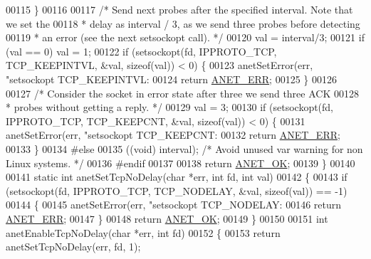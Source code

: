 \begin{DoxyCode}
{{{{00115     \}
00116 
00117     \textcolor{comment}{/* Send next probes after the specified interval. Note that we set the}
00118 \textcolor{comment}{     * delay as interval / 3, as we send three probes before detecting}
00119 \textcolor{comment}{     * an error (see the next setsockopt call). */}
00120     val = interval/3;
00121     \textcolor{keywordflow}{if} (val == 0) val = 1;
00122     \textcolor{keywordflow}{if} (setsockopt(fd, IPPROTO\_TCP, TCP\_KEEPINTVL, &val, \textcolor{keyword}{sizeof}(val)) < 0) \{
00123         anetSetError(err, \textcolor{stringliteral}{"setsockopt TCP\_KEEPINTVL: %
00124         \textcolor{keywordflow}{return} \hyperlink{anet_8h_a0697b7774a7e0f4ef141839fe93536fe}{ANET\_ERR};
00125     \}
00126 
00127     \textcolor{comment}{/* Consider the socket in error state after three we send three ACK}
00128 \textcolor{comment}{     * probes without getting a reply. */}
00129     val = 3;
00130     \textcolor{keywordflow}{if} (setsockopt(fd, IPPROTO\_TCP, TCP\_KEEPCNT, &val, \textcolor{keyword}{sizeof}(val)) < 0) \{
00131         anetSetError(err, \textcolor{stringliteral}{"setsockopt TCP\_KEEPCNT: %
00132         \textcolor{keywordflow}{return} \hyperlink{anet_8h_a0697b7774a7e0f4ef141839fe93536fe}{ANET\_ERR};
00133     \}
00134 \textcolor{preprocessor}{#}\textcolor{preprocessor}{else}
00135     ((\textcolor{keywordtype}{void}) interval); \textcolor{comment}{/* Avoid unused var warning for non Linux systems. */}
00136 \textcolor{preprocessor}{#}\textcolor{preprocessor}{endif}
00137 
00138     \textcolor{keywordflow}{return} \hyperlink{anet_8h_a25fb91ccc6457153f6d2e21380d4c6cf}{ANET\_OK};
00139 \}
00140 
00141 \textcolor{keyword}{static} \textcolor{keywordtype}{int} anetSetTcpNoDelay(\textcolor{keywordtype}{char} *err, \textcolor{keywordtype}{int} fd, \textcolor{keywordtype}{int} val)
00142 \{
00143     \textcolor{keywordflow}{if} (setsockopt(fd, IPPROTO\_TCP, TCP\_NODELAY, &val, \textcolor{keyword}{sizeof}(val)) == -1)
00144     \{
00145         anetSetError(err, \textcolor{stringliteral}{"setsockopt TCP\_NODELAY: %
00146         \textcolor{keywordflow}{return} \hyperlink{anet_8h_a0697b7774a7e0f4ef141839fe93536fe}{ANET\_ERR};
00147     \}
00148     \textcolor{keywordflow}{return} \hyperlink{anet_8h_a25fb91ccc6457153f6d2e21380d4c6cf}{ANET\_OK};
00149 \}
00150 
00151 \textcolor{keywordtype}{int} anetEnableTcpNoDelay(\textcolor{keywordtype}{char} *err, \textcolor{keywordtype}{int} fd)
00152 \{
00153     \textcolor{keywordflow}{return} anetSetTcpNoDelay(err, fd, 1);
}}}}}}}
\end{DoxyCode}
